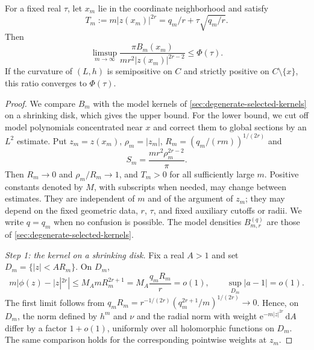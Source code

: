 \begin{theorem}\label{thm:compact-growing-jets}
For a fixed real $\tau$, let $x_m$ lie in the coordinate neighborhood and satisfy
\[
 T_m:=m|z(x_m)|^{2r}=q_m/r+\tau\sqrt{q_m/r}.
\]
Then
\begin{equation}\label{eq:compact-growing-jets-upper}
 \limsup_{m\to\infty}
 \frac{\pi B_m(x_m)}{mr^2|z(x_m)|^{2r-2}}\leq\Phi(\tau).
\end{equation}
If the curvature of $(L,h)$ is semipositive on $C$ and strictly positive on $C\setminus\{x\}$, this ratio converges to $\Phi(\tau)$.
\end{theorem}
\begin{proof}
We compare $B_m$ with the model kernels of \cref{sec:degenerate-selected-kernels} on a shrinking disk, which gives the upper bound. For the lower bound, we cut off model polynomials concentrated near $x$ and correct them to global sections by an $L^2$ estimate. Put $z_m=z(x_m)$, $\rho_m=|z_m|$, $R_m=(q_m/(rm))^{1/(2r)}$ and
\[
 S_m=\frac{mr^2\rho_m^{2r-2}}\pi.
\]
Then $R_m\to0$ and $\rho_m/R_m\to1$, and $T_m>0$ for all sufficiently large $m$. Positive constants denoted by $M$, with subscripts when needed, may change between estimates. They are independent of $m$ and of the argument of $z_m$; they may depend on the fixed geometric data, $r$, $\tau$, and fixed auxiliary cutoffs or radii. We write $q=q_m$ when no confusion is possible. The model densities $B_{m,r}^{(q)}$ are those of \cref{sec:degenerate-selected-kernels}.

\emph{Step 1: the kernel on a shrinking disk.}
Fix a real $A>1$ and set $D_m=\{|z|<A R_m\}$. On $D_m$,
\[
 m|\phi(z)-|z|^{2r}|\leq M_A mR_m^{2r+1}
 =M_A\frac{q_mR_m}{r}=o(1),\qquad
 \sup_{D_m}|a-1|=o(1).
\]
The first limit follows from $q_mR_m=r^{-1/(2r)}(q_m^{2r+1}/m)^{1/(2r)}\to0$. Hence, on $D_m$, the norm defined by $h^m$ and $\nu$ and the radial norm with weight $\mathrm{e}^{-m|z|^{2r}}\,\mathrm{d}A$ differ by a factor $1+o(1)$, uniformly over all holomorphic functions on $D_m$. The same comparison holds for the corresponding pointwise weights at $z_m$.


\end{proof}

